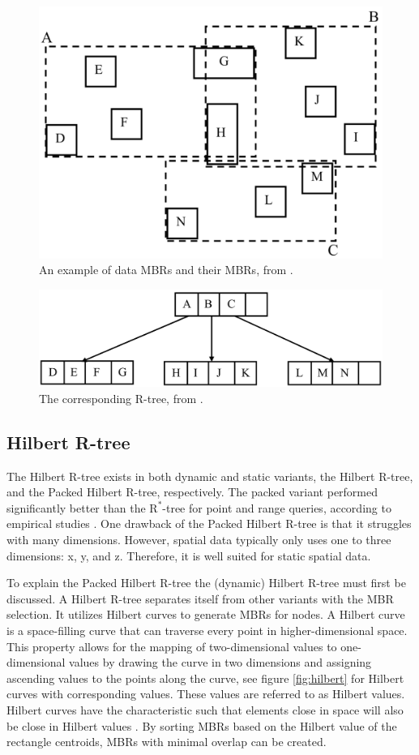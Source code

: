 \begin{figure}
    \centering
    \includegraphics[width=0.5\linewidth]{./figures/mbrs.png}
    \caption{An example of data MBRs and their MBRs, from \cite{rtree}.}
    \label{fig:mbrs}
\end{figure}
\begin{figure}
    \centering
    \includegraphics[width=\linewidth]{./figures/rtree.png}
    \caption{The corresponding R-tree, from \cite{rtree}.}
    \label{fig:rtree}
\end{figure}

\subsection{Hilbert R-tree}
The Hilbert R-tree exists in both dynamic and static variants, the Hilbert R-tree, and the Packed Hilbert R-tree, respectively. The packed variant performed significantly better than the $\text{R}^*$-tree for point and range queries, according to empirical studies \cite{rtree}. One drawback of the Packed Hilbert R-tree is that it struggles with many dimensions. However, spatial data typically only uses one to three dimensions: x, y, and z. Therefore, it is well suited for static spatial data.

To explain the Packed Hilbert R-tree the (dynamic) Hilbert R-tree must first be discussed. A Hilbert R-tree separates itself from other variants with the MBR selection. It utilizes Hilbert curves to generate MBRs for nodes. A Hilbert curve is a space-filling curve that can traverse every point in higher-dimensional space. This property allows for the mapping of two-dimensional values to one-dimensional values by drawing the curve in two dimensions and assigning ascending values to the points along the curve, see figure \ref{fig:hilbert} for Hilbert curves with corresponding values. These values are referred to as Hilbert values. Hilbert curves have the characteristic such that elements close in space will also be close in Hilbert values \cite{rtree}. By sorting MBRs based on the Hilbert value of the rectangle centroids, MBRs with minimal overlap can be created.

